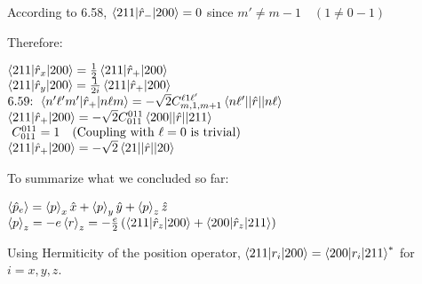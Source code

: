 \documentclass[14pt]{extarticle}
\makeatletter
\newenvironment{lefteqs}{%
    \begin{flushleft}%
    \renewcommand{\arraystretch}{1.3}%
    $\begin{array}{@{}l@{}}%
}{%
    \end{array}$%
    \end{flushleft}%
}
\makeatother
\begin{document}
According to 6.58, $\braket{211|\hat{r}_-|200}=0$ since $m' \neq m-1 \quad (1 \neq 0-1)$

Therefore:

\begin{lefteqs}
    \braket{211 | \hat{r}_x | 200} = \frac{1}{2} \braket{211 | \hat{r}_+ | 200} \\
    \braket{211 | \hat{r}_y | 200} = \frac{1}{2i} \braket{211 | \hat{r}_+ | 200} \\
    \text{6.59: } \braket{n' \ell' m' | \hat{r}_+ | n \ell m} = - \sqrt{2} C^{\ell 1 \ell'}_{m, 1, m+1} \braket{n \ell' || \hat{r} || n \ell} \\
    \braket{211 | \hat{r}_+ | 200} = - \sqrt{2} C^{0 1 1}_{0 1 1} \braket{200 || \hat{r} || 211} \\\
    C^{0 1 1}_{0 1 1} = 1 \quad \text{(Coupling with $\ell=0$ is trivial)} \\
    \braket{211 | \hat{r}_+ | 200} = - \sqrt{2} \braket{21 || \hat{r} || 20} \\
\end{lefteqs}

To summarize what we concluded so far:

\begin{lefteqs}
    \braket{\hat{p}_e} = \braket{p}_x \hat{x} + \braket{p}_y \hat{y} + \braket{p}_z \hat{z} \\
    \braket{p}_z = -e \braket{r}_z = -\frac{e}{2} \left( \braket{211 | \hat{r}_z | 200} + \braket{200 | \hat{r}_z | 211} \right) \\
\end{lefteqs}
Using Hermiticity of the position operator, $\braket{211|r_i|200} = \braket{200|r_i|211}^*$ for $i = x, y, z$.
\end{document}
